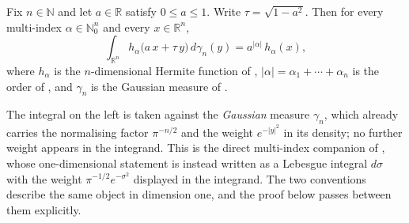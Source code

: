 \begin{lemma}
Fix $n \in \mathbb{N}$ and let $a \in \mathbb{R}$ satisfy $0 \leq a \leq 1$.  Write
$\tau = \sqrt{1-a^2}$.  Then for every multi-index $\alpha \in \mathbb{N}_0^n$ and
every $x \in \mathbb{R}^n$,
\[
  \int_{\mathbb{R}^n} h_\alpha\bigl(a\,x + \tau\,y\bigr) \, d\gamma_n(y)
    = a^{|\alpha|}\, h_\alpha(x),
\]
where $h_\alpha$ is the $n$-dimensional Hermite function of ,
$|\alpha| = \alpha_1 + \cdots + \alpha_n$ is the order of ,
and $\gamma_n$ is the Gaussian measure of .

The integral on the left is taken against the \emph{Gaussian} measure $\gamma_n$,
which already carries the normalising factor $\pi^{-n/2}$ and the weight
$e^{-|y|^2}$ in its density; no further weight appears in the integrand.  This is
the direct multi-index companion of , whose
one-dimensional statement is instead written as a Lebesgue integral $d\sigma$ with
the weight $\pi^{-1/2}e^{-\sigma^2}$ displayed in the integrand.  The two
conventions describe the same object in dimension one, and the proof below passes
between them explicitly.
\end{lemma}
